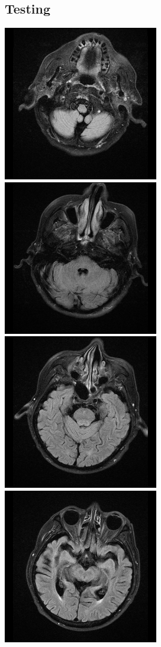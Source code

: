 \documentclass[conference]{IEEEtran}
\begin{document}
\subsection*{Testing}
\includegraphics[scale = 0.2]{origin_0.png}
\includegraphics[scale = 0.2]{origin_4.png}
\includegraphics[scale = 0.2]{origin_6.png}
\includegraphics[scale = 0.2]{origin_9.png}
\end{document}
